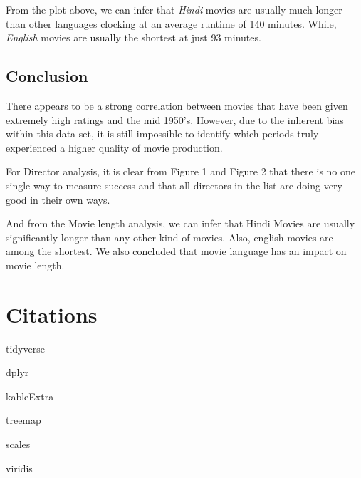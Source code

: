 \documentclass[11pt,a4paper,]{article}
\begin{document}
From the plot above, we can infer that \emph{Hindi} movies are usually much longer than other languages clocking at an average runtime of 140 minutes. While, \emph{English} movies are usually the shortest at just 93 minutes.

\hypertarget{conclusion-1}{%
\subsection{Conclusion}\label{conclusion-1}}

There appears to be a strong correlation between movies that have been given extremely high ratings and the mid 1950's. However, due to the inherent bias within this data set, it is still impossible to identify which periods truly experienced a higher quality of movie production.

For Director analysis, it is clear from Figure 1 and Figure 2 that there is no one single way to measure success and that all directors in the list are doing very good in their own ways.

And from the Movie length analysis, we can infer that Hindi Movies are usually significantly longer than any other kind of movies. Also, english movies are among the shortest. We also concluded that movie language has an impact on movie length.

\hypertarget{citations}{%
\section{Citations}\label{citations}}

tidyverse \textcite{tidyverse}

dplyr \textcite{dplyr}

kableExtra \textcite{kableExtra}

treemap \textcite{treemap}

scales \textcite{scales}

viridis \textcite{viridis}

\printbibliography
\end{document}
